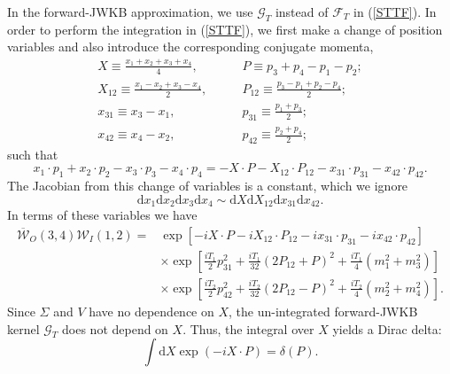 In the forward-JWKB approximation, we use $\mathcal{G}_{T}$ instead of $\mathcal{F}_{T}$ in (\ref{STTF}). In order to perform the integration in (\ref{STTF}), we first make a change of position variables and also introduce the corresponding conjugate momenta,
\begin{align}
	X \equiv \frac{x_{1} + x_{2} + x_{3} + x_{4}}{4}, &\qquad P \equiv p_{3} + p_{4} - p_{1} - p_{2}; \\
	X_{12} \equiv \frac{x_{1} - x_{2} + x_{3} - x_{4}}{2}, &\qquad P_{12} \equiv \frac{p_{3} - p_{1} + p_{2} - p_{4}}{2}; \\
	x_{31} \equiv x_{3} - x_{1}, &\qquad p_{31} \equiv \frac{p_{1} + p_{3}}{2};
	\label{p31} \\
	x_{42} \equiv x_{4} - x_{2}, &\qquad p_{42} \equiv \frac{p_{2} + p_{4}}{2};
	\label{p42}
\end{align}
such that
\begin{equation}
	x_{1} \cdot p_{1} + x_{2} \cdot p_{2} - x_{3} \cdot p_{3} - x_{4} \cdot p_{4} = - X \cdot P - X_{12} \cdot P_{12} - x_{31} \cdot p_{31} - x_{42} \cdot p_{42}.
\end{equation}
The Jacobian from this change of variables is a constant, which we ignore
\begin{equation}
	\mathrm{d}x_{1} \mathrm{d}x_{2} \mathrm{d}x_{3} \mathrm{d}x_{4} \sim \mathrm{d}X \mathrm{d}X_{12} \mathrm{d}x_{31} \mathrm{d}x_{42}.
\end{equation}
In terms of these variables we have
\begin{equation}
\begin{split}
	\overline{\mathcal{W}}_{O}(3, 4) \mathcal{W}_{I}(1, 2) = {}& \exp{\left[ -i X \cdot P -i X_{12} \cdot P_{12} -i x_{31} \cdot p_{31} -i x_{42} \cdot p_{42} \right]} \\
	&\times \exp{\left[ \frac{i T_{1}}{2} p_{31}^{2} + \frac{i T_{1}}{32} \left( 2 P_{1 2} + P \right)^{2} + \frac{i T_{1}}{4} (m_{1}^{2} + m_{3}^{2}) \right]} \\
	&\times \exp{\left[ \frac{i T_{2}}{2} p_{42}^{2} + \frac{i T_{2}}{32} \left( 2 P_{1 2} - P \right)^{2} + \frac{i T_{2}}{4} (m_{2}^{2} + m_{4}^{2}) \right]}.
\end{split}
\end{equation}
Since $\Sigma$ and $V$ have no dependence on $X$, the un-integrated forward-JWKB kernel $\mathcal{G}_{T}$ does not depend on $X$. Thus, the integral over $X$ yields a Dirac delta:
\begin{equation}
	\int \mathrm{d}X \exp{(-i X \cdot P)} = \delta(P).
\end{equation}
